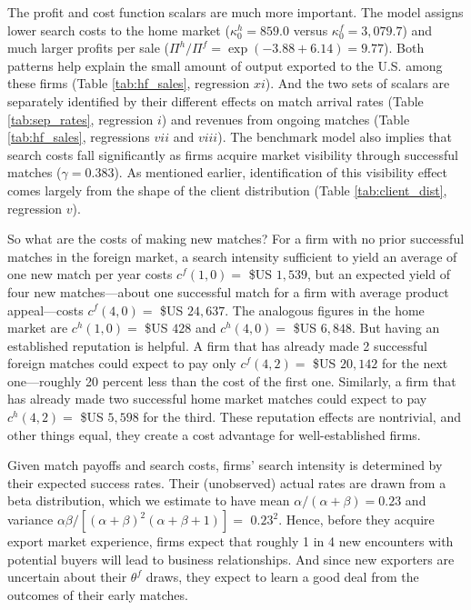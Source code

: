 \documentclass[12pt]{article}
\begin{document}
The profit and cost function scalars are much more important. The model
assigns lower search costs to the home market ($\kappa _{0}^{h}=859.0$
versus $\kappa _{0}^{f}=3,079.7$) and much larger profits per sale ($\Pi
^{h}/\Pi ^{f}=\exp \left( -3.88+6.14\right) =9.77$). Both patterns help
explain the small amount of output exported to the U.S. among these firms
(Table \ref{tab:hf_sales}, regression $xi$). And the two sets of scalars are
separately identified by their different effects on match arrival rates
(Table \ref{tab:sep_rates}, regression $i$) and revenues from ongoing
matches (Table \ref{tab:hf_sales}, regressions $vii$ and $viii$). The
benchmark model also implies that search costs fall significantly as firms
acquire market visibility through successful matches ($\gamma =0.383$). As
mentioned earlier, identification of this visibility effect comes largely
from the shape of the client distribution (Table \ref{tab:client_dist},
regression $v$).

So what are the costs of making new matches? For a firm with no prior
successful matches in the foreign market, a search intensity sufficient to
yield an average of one new match per year costs $c^{f}(1,0)=$ \$US $1,539$, but an expected yield of four new matches---about one successful
match for a firm with average product appeal---costs $c^{f}(4,0)=$ \$US $%
24,637$. The analogous figures in the home market are $c^{h}(1,0)=$ \$US $%
428 $ and $c^{h}(4,0)=$ \$US $6,848$. But having an established reputation
is helpful. A firm that has already made 2 successful foreign matches could
expect to pay only $c^{f}(4,2)=$ \$US $20,142$ for the next
one---roughly 20 percent less than the cost of the first one. Similarly, a
firm that has already made two successful home market matches could expect
to pay $c^{h}(4,2)=$ \$US $5,598$ for the third. These reputation effects
are nontrivial, and other things equal, they create a cost advantage for
well-established firms.

Given match payoffs and search costs, firms' search intensity is determined
by their expected success rates. Their (unobserved) actual rates are drawn
from a beta distribution, which we estimate to have mean $\alpha /(\alpha
+\beta )=0.23$ and variance $\alpha \beta /\left[ (\alpha
+\beta )^{2}(\alpha +\beta +1)\right] =$ $0.23^{2}$. Hence, before they acquire
export market experience, firms expect that roughly 1 in 4 new encounters
with potential buyers will lead to business relationships. And since new
exporters are uncertain about their $\theta ^{f}$ draws, they expect to
learn a good deal from the outcomes of their early matches.\ 
\end{document}
